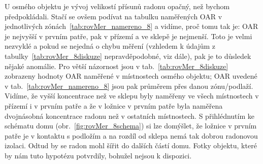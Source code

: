 U osmého objektu je vývoj velikostí přísunů radonu opačný, než bychom předpokládali. Stačí se ovšem podívat na tabulku naměřených OAR v jednotlivých zónách~\ref{tab:rovMer_namereno_8} a vidíme, proč tomu tak je: OAR je nejvyšší v prvním patře, pak v přízemí a ve sklepě je nejmenší. Toto je velmi nezvyklé a pokud se nejedná o chybu měření (vzhledem k údajům z tabulky~\ref{tab:rovMer_8diskuze} nepravděpodobné, viz dále), pak je to důsledek nějaké anomálie. Pro větší názornost jsou v tab.~\ref{tab:rovMer_8diskuze} zobrazeny hodnoty OAR naměřené v místnostech osmého objektu; OAR uvedené v tab.~\ref{tab:rovMer_namereno_8} jsou pak průměrem přes danou zónu/podlaží. Vidíme, že vyšší koncentrace než ve sklepu byly naměřeny ve všech místnostech v přízemí i v prvním patře a že v ložnice v prvním
patře byla naměřena dvojnásobná koncentrace radonu než v ostatních místnostech. S přihlédnutím ke schématu domu (obr.~\ref{fig:rovMer_8schema}) si lze domýšlet, že ložnice v prvním patře je v kontaktu s podložím a na rozdíl od sklepa nemá tak dobrou radonovou izolaci. Odtud by se radon mohl šířit do dalších částí domu. Fotky objektu, které by nám tuto hypotézu potvrdily, bohužel nejsou k dispozici.

